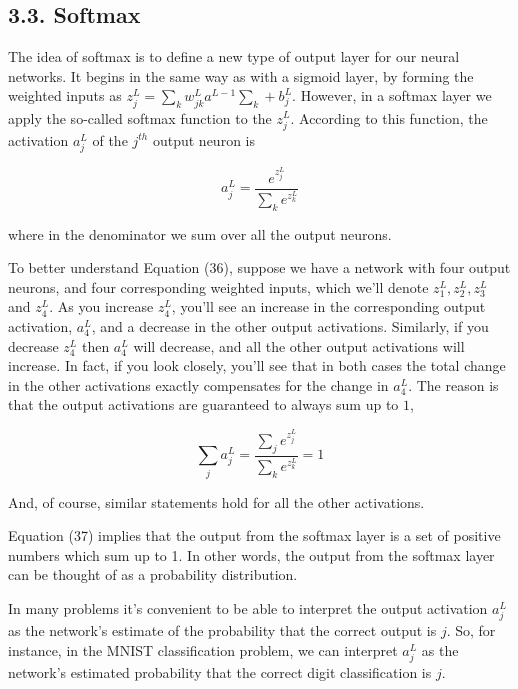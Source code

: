 \documentclass[12 pt]{article}
\begin{document}
\subsection{3.3. Softmax}\label{softmax}

The idea of softmax is to define a new type of output layer for our
neural networks. It begins in the same way as with a sigmoid layer, by
forming the weighted inputs as $ z^L_j = \sum_k w^L_{jk}
a^{L - 1}\sum_k + b^L_j $.
However, in a softmax layer we apply the so-called softmax function to the
$ z^L_j $. According to this function, the activation $ a^L_j $
of the $ j^{th} $ output neuron is

\begin{equation}
    a^L_j = \frac{e^{z^L_j}}{\sum_k e^{z^L_k}}
\end{equation}

where in the denominator we sum over all the output neurons.

To better understand Equation (36), suppose we have a network with four
output neurons, and four corresponding weighted inputs, which we'll
denote $ z^L_1, z^L_2, z^L_3 $ and $ z^L_4 $. As you increase $ z^L_4 $,
you'll see an increase in the corresponding output activation, $ a^L_4 $,
and a decrease in the other output activations. Similarly, if you decrease
$ z^L_4 $ then $ a^L_4 $ will decrease, and all the other
output activations will increase. In fact, if you look closely, you'll
see that in both cases the total change in the other activations exactly
compensates for the change in $ a^L_4 $. The reason is that the output
activations are guaranteed to always sum up to $ 1 $,

\begin{equation}
        \sum_j a^L_j = \frac{\sum_j e^{z^L_j}}{\sum_k e^{z^L_k}} = 1
\end{equation}

And, of course, similar statements hold for all the other activations.

Equation (37) implies that the output from the softmax layer is a set of
positive numbers which sum up to 1. In other words, the output from the
softmax layer can be thought of as a probability distribution.

In many problems it's convenient to be able to interpret the output
activation $ a^L_j $ as the network's estimate of the probability
that the correct output is $ j $. So, for instance, in the
MNIST classification problem, we can interpret
$ a^L_j $ as the network's estimated probability that the correct
digit classification is $ j $.
\end{document}
